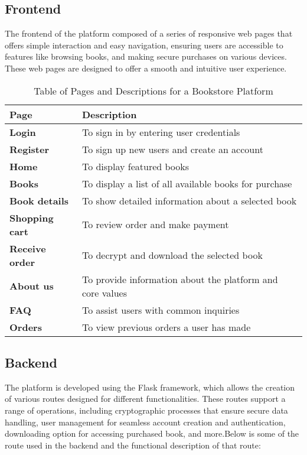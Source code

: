 \documentclass[12pt]{article}
\begin{document}
\pagebreak
\subsection{Frontend}
The frontend of the platform composed of a series of responsive web pages that offers simple interaction and easy navigation, ensuring users are accessible to features like browsing books, and making secure purchases on various devices. These web pages are designed to offer a smooth and intuitive user experience. 
\begin{table}[htbp]
	\centering
	\begin{tabular}{|>{\bfseries}m{3cm}|m{10cm}|}  %
		\hline
		\textbf{Page} & \textbf{Description} \\
		\hline
		Login         & To sign in by entering user credentials \\
		\hline
		Register      & To sign up new users and create an account \\
		\hline
		Home          & To display featured books \\
		\hline
		Books         & To display a list of all available books for purchase \\
		\hline
		Book details  & To show detailed information about a selected book \\
		\hline
		Shopping cart & To review order and make payment \\
		\hline
		Receive order & To decrypt and download the selected book \\
		\hline
		About us      & To provide information about the platform and core values \\
		\hline
		FAQ           & To assist users with common inquiries \\
		\hline
		Orders        & To view previous orders a user has made \\
		\hline
	\end{tabular}
	\caption{Table of Pages and Descriptions for a Bookstore Platform}
	\label{tab:pages_descriptions}
\end{table}

\subsection{Backend}
The platform is developed using the Flask framework, which allows the creation of various routes designed for different functionalities. These routes support a range of operations, including cryptographic processes that ensure secure data handling, user management for seamless account creation and authentication, downloading option for accessing purchased book, and more.Below is some of the route used in the backend and the functional description of that route:
\end{document}
